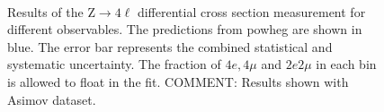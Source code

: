 \begin{figure}[!h!tb]
\begin{center}
{      \label{fig:differential-results-asimov-Z4l:b}
    } \\
    \caption{Results of the Z$\rightarrow 4 \ell$ differential cross section measurement for different observables. The predictions from {\sc powheg} are shown in blue. The error bar represents the combined statistical and systematic uncertainty. The fraction of $4e,4\mu$ and $2e2\mu$ in each bin is allowed to float in the fit.
    COMMENT: Results shown with Asimov dataset.
    }
  \label{fig:differential-results-asimov-Z4l}
 \end{center}
\end{figure}

